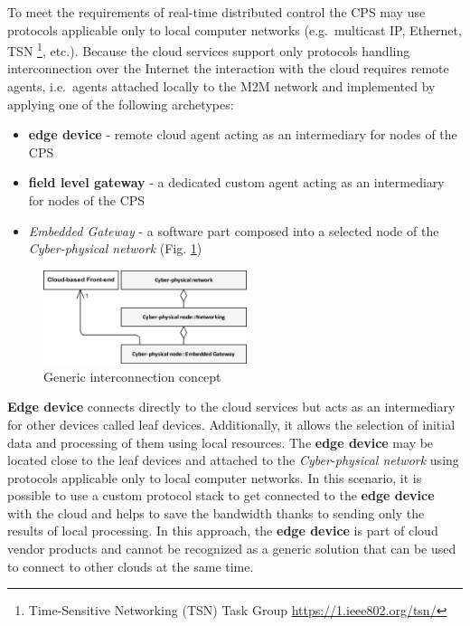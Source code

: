 \documentclass[runningheads]{llncs}
\begin{document}
To meet the requirements of real-time distributed control the CPS may use protocols applicable only to local computer networks (e.g.~multicast IP, Ethernet, TSN \footnote{Time-Sensitive Networking (TSN) Task Group \url{https://1.ieee802.org/tsn/}}, etc.). Because the cloud services support only protocols handling interconnection over the Internet the interaction with the cloud requires remote agents, i.e.~agents attached locally to the M2M network and implemented by applying one of the following archetypes:

\begin{itemize}
      \item \textbf{edge device} - remote cloud agent acting as an intermediary for nodes of the CPS
      \item \textbf{field level gateway} - a dedicated custom agent acting as an intermediary for nodes of the CPS
      \item \emph{Embedded Gateway} - a software part composed into a selected node of the \emph{Cyber-physical network} (Fig. \ref{figure1.StrategyDomainModel})
\end{itemize}

\begin{figure}
      \centering
      \includegraphics[width=0.53\textwidth]{../../.Media/StrategyDomainModel.png}
      \caption{Generic interconnection concept}\label{figure1.StrategyDomainModel}
\end{figure}

\textbf{Edge device} connects directly to the cloud services but acts as an intermediary for other devices called leaf devices. Additionally, it allows the selection of initial data and processing of them using local resources. The \textbf{edge device} may be located close to the leaf devices and attached to the \emph{Cyber-physical network} using protocols applicable only to local computer networks. In this scenario, it is possible to use a custom protocol stack to get connected to the \textbf{edge device} with the cloud and helps to save the bandwidth thanks to sending only the results of local processing. In this approach, the \textbf{edge device} is part of cloud vendor products and cannot be recognized as a generic solution that can be used to connect to other clouds at the same time.
\end{document}
